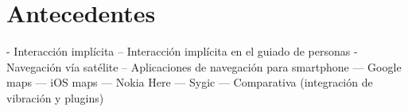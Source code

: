 \chapter{Antecedentes}
\label{chap:antecedentes}

- Interacción implícita
-- Interacción implícita en el guiado de personas
- Navegación vía satélite
-- Aplicaciones de navegación para smartphone
--- Google maps
--- iOS maps
--- Nokia Here
--- Sygic
--- Comparativa (integración de vibración y plugins)

